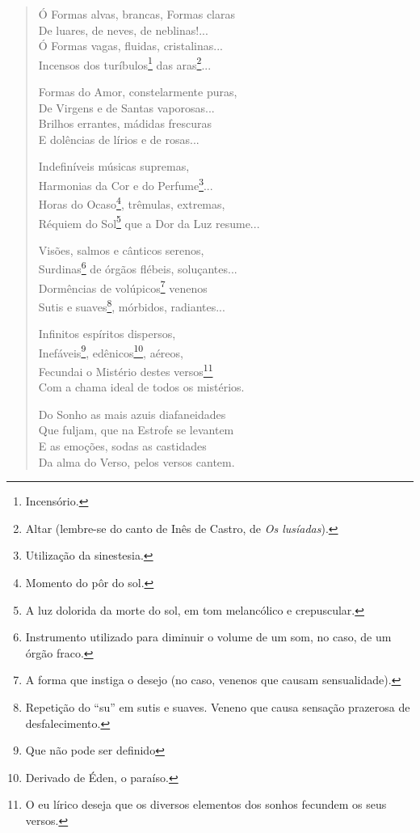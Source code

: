 \begin{verse}
 Ó Formas alvas, brancas, Formas claras \\
 De luares, de neves, de neblinas!... \\
 Ó Formas vagas, fluidas, cristalinas... \\
 Incensos dos turíbulos\footnote{Incensório.} das aras\footnote{Altar (lembre-se do canto de Inês de Castro, de \textit{Os lusíadas}).}...

 Formas do Amor, constelarmente puras, \\
 De Virgens e de Santas vaporosas... \\
 Brilhos errantes, mádidas frescuras \\
 E dolências de lírios e de rosas...
 
 Indefiníveis músicas supremas, \\
 Harmonias da Cor e do Perfume\footnote{Utilização da sinestesia.}... \\
 Horas do Ocaso\footnote{Momento do pôr do sol.}, trêmulas, extremas, \\
 Réquiem do Sol\footnote{A luz dolorida da morte do sol, em tom melancólico e crepuscular.} que a Dor da Luz resume...
 
 Visões, salmos e cânticos serenos, \\
 Surdinas\footnote{Instrumento utilizado para diminuir o volume de um som, no caso, de um órgão fraco.} de órgãos flébeis, soluçantes... \\
 Dormências de volúpicos\footnote{A forma que instiga o desejo (no caso, venenos que causam sensualidade).} venenos \\
 Sutis e suaves\footnote{Repetição do ``su'' em sutis e suaves. Veneno que causa sensação prazerosa de desfalecimento.}, mórbidos, radiantes...
 
 Infinitos espíritos dispersos, \\
 Inefáveis\footnote{Que não pode ser definido}, edênicos\footnote{Derivado de Éden, o paraíso.}, aéreos, \\
 Fecundai o Mistério destes versos\footnote{O eu lírico deseja que os diversos elementos dos sonhos fecundem os seus versos.} \\
 Com a chama ideal de todos os mistérios.
 
 Do Sonho as mais azuis diafaneidades \\
 Que fuljam, que na Estrofe se levantem \\
 E as emoções, sodas as castidades \\
 Da alma do Verso, pelos versos cantem.
 

\end{verse}
